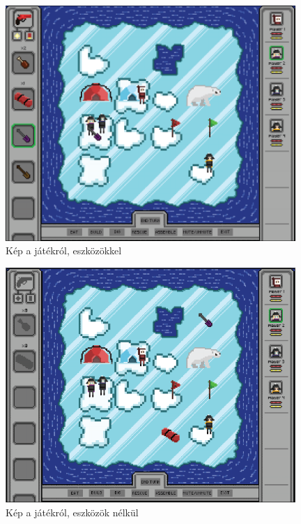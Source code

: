 \begin{figure}[H]
	\begin{center}
		\includegraphics[width=11cm]{chapters/chapter11/res/game1.png}
		\caption{Kép a játékról, eszközökkel}
		\label{fig:Game1}
	\end{center}
\end{figure}
\begin{figure}[H]
	\begin{center}
		\includegraphics[width=11cm]{chapters/chapter11/res/game2.png}
		\caption{Kép a játékról, eszközök nélkül}
		\label{fig:Game2}
	\end{center}
\end{figure}

